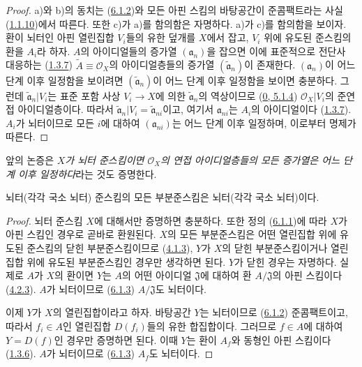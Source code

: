 \begin{proof}
a)와 b)의 동치는 (\hyperref[I.6.1.2-ko]{6.1.2})와 모든 아핀 스킴의
바탕공간이 준콤팩트라는 사실
(\hyperref[I.1.1.10-ko]{1.1.10})에서 따른다. 또한 c)가 a)를
함의함은 자명하다. a)가 c)를 함의함을 보이자. 환이 뇌터인 아핀
열린집합 $V_i$들의 유한 덮개를 $X$에서 잡고, $V_i$ 위에 유도된
준스킴의 환을 $A_i$라 하자. $A$의 아이디얼들의 증가열
$(\mathfrak{a}_n)$을 잡으면 이에 표준적으로 전단사 대응하는
(\hyperref[I.1.3.7-ko]{1.3.7})
$\widetilde{A}\equiv\mathscr{O}_X$의 아이디얼층들의 증가열
$(\widetilde{\mathfrak{a}}_n)$이 존재한다. $(\mathfrak{a}_n)$이
어느 단계 이후 일정함을 보이려면 $(\widetilde{\mathfrak{a}}_n)$이
어느 단계 이후 일정함을
보이면 충분하다. 그런데 $\widetilde{\mathfrak{a}}_n|V_i$는 표준
포함 사상 $V_i\to X$에 의한 $\widetilde{\mathfrak{a}}_n$의
역상이므로 (\hyperref[0.5.1.4-ko]{0, 5.1.4})
$\mathscr{O}_X|V_i$의 준연접 아이디얼층이다. 따라서
$\widetilde{\mathfrak{a}}_n|V_i=\widetilde{\mathfrak{a}}_{ni}$이고,
여기서 $\mathfrak{a}_{ni}$는 $A_i$의 아이디얼이다
(\hyperref[I.1.3.7-ko]{1.3.7}). $A_i$가 뇌터이므로 모든 $i$에
대하여 $(\mathfrak{a}_{ni})$는 어느 단계 이후 일정하며, 이로부터
명제가 따른다.
\end{proof}

앞의 논증은 \emph{$X$가 뇌터 준스킴이면 $\mathscr{O}_X$의 연접
아이디얼층들의 모든 증가열은 어느 단계 이후 일정하다}라는 것도
증명한다.

\begin{proposition}[6.1.4]
\label{I.6.1.4-ko}
뇌터(각각 국소 뇌터) 준스킴의 모든 부분준스킴은 뇌터(각각 국소
뇌터)이다.
\end{proposition}

\begin{proof}
뇌터 준스킴 $X$에 대해서만 증명하면 충분하다. 또한 정의
(\hyperref[I.6.1.1-ko]{6.1.1})에 따라 $X$가 아핀 스킴인 경우로
곧바로 환원된다. $X$의 모든 부분준스킴은 어떤 열린집합 위에 유도된
준스킴의 닫힌 부분준스킴이므로
(\hyperref[I.4.1.3-ko]{4.1.3}), $Y$가 $X$의 닫힌 부분준스킴이거나
열린집합 위에 유도된 부분준스킴인 경우만 생각하면 된다. $Y$가
닫힌 경우는 자명하다. 실제로 $A$가 $X$의 환이면 $Y$는 $A$의 어떤
아이디얼 $\mathfrak{J}$에 대하여 환 $A/\mathfrak{J}$의 아핀
스킴이다(\hyperref[I.4.2.3-ko]{4.2.3}). $A$가 뇌터이므로
(\hyperref[I.6.1.3-ko]{6.1.3}) $A/\mathfrak{J}$도 뇌터이다.

이제 $Y$가 $X$의 열린집합이라고 하자. 바탕공간 $Y$는 뇌터이므로
(\hyperref[I.6.1.2-ko]{6.1.2}) 준콤팩트이고, 따라서
$f_i\in A$인 열린집합 $D(f_i)$들의 유한 합집합이다.
그러므로 $f\in A$에 대하여 $Y=D(f)$인 경우만 증명하면 된다. 이때
$Y$는 환이 $A_f$와 동형인 아핀 스킴이다
(\hyperref[I.1.3.6-ko]{1.3.6}). $A$가 뇌터이므로
(\hyperref[I.6.1.3-ko]{6.1.3}) $A_f$도 뇌터이다.
\end{proof}

